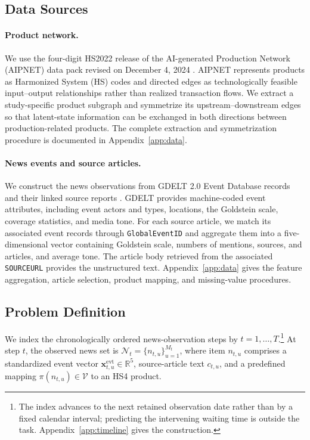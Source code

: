 \documentclass[letterpaper]{article} %
\begin{document}
\subsection{Data Sources}
\label{sec:data-sources}

\paragraph{Product network.}
We use the four-digit HS2022 release of the AI-generated Production Network (AIPNET) data pack revised on December 4, 2024 \cite{fetzer2024ai}. AIPNET represents products as Harmonized System (HS) codes and directed edges as technologically feasible input--output relationships rather than realized transaction flows. We extract a study-specific product subgraph and symmetrize its upstream--downstream edges so that latent-state information can be exchanged in both directions between production-related products. The complete extraction and symmetrization procedure is documented in Appendix~\ref{app:data}.

\paragraph{News events and source articles.}
We construct the news observations from GDELT 2.0 Event Database records and their linked source reports \cite{leetaru2013gdelt,gdelt2015eventcodebook}. GDELT provides machine-coded event attributes, including event actors and types, locations, the Goldstein scale, coverage statistics, and media tone. For each source article, we match its associated event records through \texttt{GlobalEventID} and aggregate them into a five-dimensional vector containing Goldstein scale, numbers of mentions, sources, and articles, and average tone. The article body retrieved from the associated \texttt{SOURCEURL} provides the unstructured text. Appendix~\ref{app:data} gives the feature aggregation, article selection, product mapping, and missing-value procedures.

\subsection{Problem Definition}
We index the chronologically ordered news-observation steps by \(t=1,\ldots,T\).\footnote{The index advances to the next retained observation date rather than by a fixed calendar interval; predicting the intervening waiting time is outside the task. Appendix~\ref{app:timeline} gives the construction.} At step \(t\), the observed news set is \(\mathcal N_t=\{n_{t,u}\}_{u=1}^{M_t}\), where item \(n_{t,u}\) comprises a standardized event vector \(\mathbf x^{\mathrm{evt}}_{t,u}\in\mathbb R^5\), source-article text \(c_{t,u}\), and a predefined mapping \(\pi(n_{t,u})\in\mathcal V\) to an HS4 product.
\end{document}

